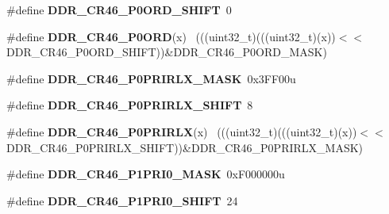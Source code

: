 \begin{DoxyCompactItemize}
\item 
\hypertarget{group___d_d_r___register___masks_gaadbbe531641ad62395be51c807918d3a}{}\#define {\bfseries D\+D\+R\+\_\+\+C\+R46\+\_\+\+P0\+O\+R\+D\+\_\+\+S\+H\+I\+F\+T}~0\label{group___d_d_r___register___masks_gaadbbe531641ad62395be51c807918d3a}

\item 
\hypertarget{group___d_d_r___register___masks_ga77c204e5c04bc9a554aa750c597d9b4b}{}\#define {\bfseries D\+D\+R\+\_\+\+C\+R46\+\_\+\+P0\+O\+R\+D}(x)                                            ~(((uint32\+\_\+t)(((uint32\+\_\+t)(x))$<$$<$D\+D\+R\+\_\+\+C\+R46\+\_\+\+P0\+O\+R\+D\+\_\+\+S\+H\+I\+F\+T))\&D\+D\+R\+\_\+\+C\+R46\+\_\+\+P0\+O\+R\+D\+\_\+\+M\+A\+S\+K)\label{group___d_d_r___register___masks_ga77c204e5c04bc9a554aa750c597d9b4b}

\item 
\hypertarget{group___d_d_r___register___masks_ga29586073b3ecc0a9027bf32305016b84}{}\#define {\bfseries D\+D\+R\+\_\+\+C\+R46\+\_\+\+P0\+P\+R\+I\+R\+L\+X\+\_\+\+M\+A\+S\+K}~0x3\+F\+F00u\label{group___d_d_r___register___masks_ga29586073b3ecc0a9027bf32305016b84}

\item 
\hypertarget{group___d_d_r___register___masks_ga4641eb29cc3d73a4910a44566c6fe062}{}\#define {\bfseries D\+D\+R\+\_\+\+C\+R46\+\_\+\+P0\+P\+R\+I\+R\+L\+X\+\_\+\+S\+H\+I\+F\+T}~8\label{group___d_d_r___register___masks_ga4641eb29cc3d73a4910a44566c6fe062}

\item 
\hypertarget{group___d_d_r___register___masks_ga07497011f7cfd24338359ee0fd0e2c5e}{}\#define {\bfseries D\+D\+R\+\_\+\+C\+R46\+\_\+\+P0\+P\+R\+I\+R\+L\+X}(x)                                      ~(((uint32\+\_\+t)(((uint32\+\_\+t)(x))$<$$<$D\+D\+R\+\_\+\+C\+R46\+\_\+\+P0\+P\+R\+I\+R\+L\+X\+\_\+\+S\+H\+I\+F\+T))\&D\+D\+R\+\_\+\+C\+R46\+\_\+\+P0\+P\+R\+I\+R\+L\+X\+\_\+\+M\+A\+S\+K)\label{group___d_d_r___register___masks_ga07497011f7cfd24338359ee0fd0e2c5e}

\item 
\hypertarget{group___d_d_r___register___masks_ga2479949ba30d7eeef1a46150b1dee101}{}\#define {\bfseries D\+D\+R\+\_\+\+C\+R46\+\_\+\+P1\+P\+R\+I0\+\_\+\+M\+A\+S\+K}~0x\+F000000u\label{group___d_d_r___register___masks_ga2479949ba30d7eeef1a46150b1dee101}

\item 
\hypertarget{group___d_d_r___register___masks_ga1f1151fc20444f72936ab9c7de65d33f}{}\#define {\bfseries D\+D\+R\+\_\+\+C\+R46\+\_\+\+P1\+P\+R\+I0\+\_\+\+S\+H\+I\+F\+T}~24\label{group___d_d_r___register___masks_ga1f1151fc20444f72936ab9c7de65d33f}


\end{DoxyCompactItemize}
